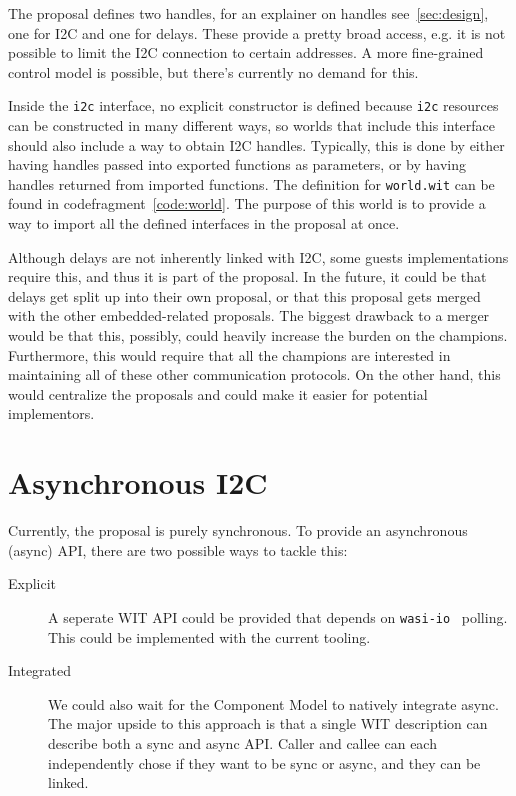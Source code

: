 The proposal defines two handles, for an explainer on handles see~\ref{sec:design}, one for \gls{I2C} and one for delays. These provide a pretty broad access, e.g. it is not possible to limit the \gls{I2C} connection to certain addresses. A more fine-grained control model is possible, but there's currently no demand for this.

Inside the \texttt{i2c} interface, no explicit constructor is defined because \texttt{i2c} resources can be constructed in many different ways, so worlds that include this interface should also include a way to obtain \gls{I2C} handles. Typically, this is done by either having handles passed into exported functions as parameters, or by having handles returned from imported functions.
The definition for \texttt{world.wit} can be found in codefragment~\ref{code:world}. The purpose of this world is to provide a way to import all the defined interfaces in the proposal at once.

Although delays are not inherently linked with \gls{I2C}, some guests implementations require this, and thus it is part of the proposal. In the future, it could be that delays get split up into their own proposal, or that this proposal gets merged with the other embedded-related proposals. The biggest drawback to a merger would be that this, possibly, could heavily increase the burden on the champions. Furthermore, this would require that all the champions are interested in maintaining all of these other communication protocols. On the other hand, this would centralize the proposals and could make it easier for potential implementors.

\section{Asynchronous I2C}

Currently, the proposal is purely synchronous. To provide an asynchronous (async) API, there are two possible ways to tackle this:

\begin{description}
    \item[Explicit] A seperate WIT API could be provided that depends on \texttt{wasi-io}~\cite{gh:io} polling. This could be implemented with the current tooling.
    \item[Integrated] We could also wait for the Component Model to natively integrate async. The major upside to this approach is that a single WIT description can describe both a sync and async API. Caller and callee can each independently chose if they want to be sync or async, and they can be linked.
\end{description}

